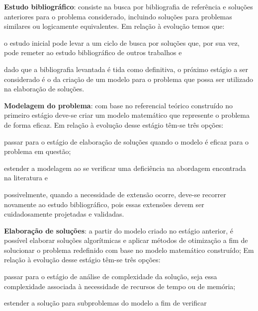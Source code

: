 \begin{compactenum}
\item {\bf Estudo bibliográfico}: consiste na busca por bibliografia de
    referência e soluções anteriores para o problema considerado, incluindo
    soluções para problemas similares ou logicamente equivalentes.
    Em relação à evolução temos que:
    \begin{compactenum}[(i)]
    \item o estudo inicial pode levar a um ciclo de busca por soluções que,
        por sua vez, pode remeter ao estudo bibliográfico de outros trabalhos
        e
    \item dado que a bibliografia levantada é tida como definitiva, o próximo
        estágio a ser considerado é o da criação de um modelo para o problema
        que possa ser utilizado na elaboração de soluções.
    \end{compactenum}
\item {\bf Modelagem do problema}: com base no referencial teórico construído
    no primeiro estágio deve-se criar um modelo matemático que represente o
    problema de forma eficaz.
    Em relação à evolução desse estágio têm-se três opções:
    \begin{compactenum}[(i)]
    \item passar para o estágio de elaboração de soluções quando o modelo é
        eficaz para o problema em questão;
    \item estender a modelagem ao se verificar uma deficiência na abordagem
        encontrada na literatura e
    \item possivelmente, quando a necessidade de extensão ocorre, deve-se
        recorrer novamente ao estudo bibliográfico, pois essas extensões
        devem ser cuidadosamente projetadas e validadas.
    \end{compactenum}
\item {\bf Elaboração de soluções}: a partir do modelo criado no estágio
    anterior, é possível elaborar soluções algorítmicas e aplicar métodos de
    otimização a fim de solucionar o problema redefinido com base no modelo
    matemático construído;
    Em relação à evolução desse estágio têm-se três opções:
    \begin{compactenum}[(i)]
    \item passar para o estágio de análise de complexidade da solução, seja
        essa complexidade associada à necessidade de recursos de tempo ou de
        memória;
    \item estender a solução para subproblemas do modelo a fim de verificar

\end{compactenum}
\end{compactenum}
